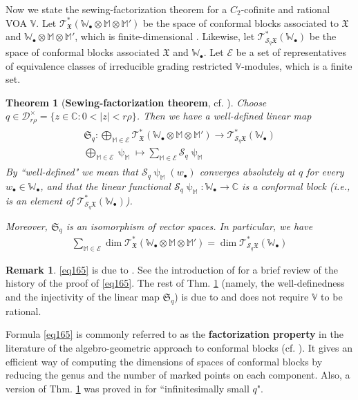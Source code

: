 \documentclass[11pt,b5paper,notitlepage]{article}
\theoremstyle{definition}
\newtheorem{rem}[df]{Remark}
\theoremstyle{plain}
\newtheorem{thm}[df]{Theorem}
\newcommand{\fk}{\mathfrak}
\newcommand{\mc}{\mathcal}
\newcommand{\scr}{\mathscr}
\newcommand{\blt}{\bullet}
\newcommand{\Vbb}{\mathbb V}
\newcommand{\Wbb}{\mathbb W}
\newcommand{\Mbb}{\mathbb M}
\newcommand{\Cbb}{\mathbb C}
\newcommand{\<}{\left\langle}
\renewcommand{\>}{\right\rangle}
\newcommand{\fx}{\mathfrak{X}}
\numberwithin{equation}{section}
\begin{document}
Now we state the sewing-factorization theorem for a $C_2$-cofinite and rational VOA $\Vbb$. Let $\scr T_{\fx}^*(\Wbb_\blt\otimes\Mbb\otimes\Mbb')$ be the space of conformal blocks associated to $\fx$ and $\Wbb_\blt\otimes\Mbb\otimes\Mbb'$, which is finite-dimensional \cite{AN03-finite-dimensional,DGT2}. Likewise, let $\scr T_{\mc S_q\fx}^*(\Wbb_\blt)$ be the space of conformal blocks associated $\fx$ and $\Wbb_\blt$. Let $\mc E$ be a set of representatives of equivalence classes of irreducible grading restricted $\Vbb$-modules, which is a finite set.

\begin{thm}[\textbf{Sewing-factorization theorem}, cf. {\cite[Thm. 12.1]{Gui-sewingconvergence}}]  \label{lb77}
Choose $q\in\mc D_{r\rho}^\times=\{z\in\Cbb:0<|z|<r\rho\}$. Then we have a well-defined linear map
\begin{gather}\label{eq170}
\begin{gathered}
\fk S_q:\bigoplus_{\Mbb\in\mc E} \scr T_{\fx}^*(\Wbb_\blt\otimes\Mbb\otimes\Mbb')\rightarrow \scr T_{\mc S_q\fx}^*(\Wbb_\blt)\\
\bigoplus_{\Mbb\in\mc E}\uppsi_\Mbb\mapsto \sum_{\Mbb\in\mc E} \mc S_q\uppsi_\Mbb
\end{gathered}
\end{gather}
By ``well-defined" we mean that  $\mc S_q\uppsi_\Mbb(w_\blt)$ converges absolutely at $q$ for every $w_\blt\in\Wbb_\blt$, and that the linear functional $\mc S_q\uppsi_\Mbb:\Wbb_\blt\rightarrow\Cbb$ is a conformal block (i.e., is an element of $\scr T_{\mc S_q\fx}^*(\Wbb_\blt)$). 

Moreover, $\fk S_q$ is an isomorphism of vector spaces. In particular, we have
\begin{align}
\sum_{\Mbb\in\mc E} \dim\scr T_{\fx}^*(\Wbb_\blt\otimes\Mbb\otimes\Mbb')=\dim \scr T_{\mc S_q\fx}^*(\Wbb_\blt)  \label{eq165}
\end{align}
\end{thm}


\begin{rem}\label{lb78}
\eqref{eq165} is due to \cite[Thm. 7.0.1]{DGT2}. See the introduction of \cite{DGT2} for a brief review of the history of the proof of \eqref{eq165}. The rest of Thm. \ref{lb77} (namely, the well-definedness and the injectivity of the linear map $\fk S_q$) is due to \cite[Thm. 12.1]{Gui-sewingconvergence} and does not require $\Vbb$ to be rational.
\end{rem}

Formula \eqref{eq165} is commonly referred to as the \textbf{factorization property} in the literature of the algebro-geometric approach to conformal blocks (cf. \cite{TUY,BFM-conformal-blocks,NT-P1_conformal_blocks}). It gives an efficient way of computing the dimensions of spaces of conformal blocks by reducing the genus and the number of marked points on each component. Also, a version of Thm. \ref{lb77} was proved in \cite[Thm. 8.5.1]{DGT2} for ``infinitesimally small $q$".
\end{document}
